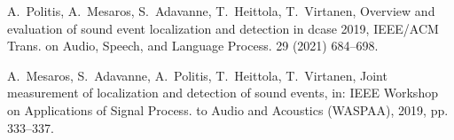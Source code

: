 \documentclass[3p, preprint, twocolumn]{elsarticle}
\begin{document}
\begin{thebibliography}{10}
A.~Politis, A.~Mesaros, S.~Adavanne, T.~Heittola, T.~Virtanen, Overview and
  evaluation of sound event localization and detection in dcase 2019,
  {IEEE/ACM} Trans. on Audio, Speech, and Language Process. 29 (2021) 684--698.

A.~Mesaros, S.~Adavanne, A.~Politis, T.~Heittola, T.~Virtanen, Joint
  measurement of localization and detection of sound events, in: {IEEE}
  Workshop on Applications of Signal Process. to Audio and Acoustics
  ({WASPAA}), 2019, pp. 333--337.

\end{thebibliography}
\end{document}
